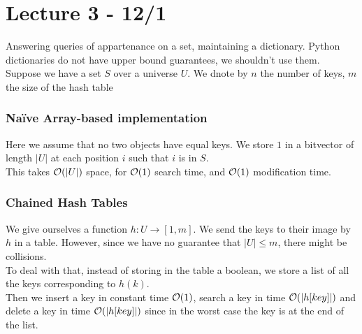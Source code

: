 \documentclass{cours}
\begin{document}
\part[Hashing]{Lecture 3 - 12/1}
\localtableofcontents

Answering queries of appartenance on a set, maintaining a dictionary. Python dictionaries do not have upper bound guarantees, we shouldn't use them. \\
Suppose we have a set $S$ over a universe $U$. We dnote by $n$ the number of keys, $m$ the size of the hash table

\section{Naïve Array-based implementation}
Here we assume that no two objects have equal keys. We store $1$ in a bitvector of length $|U|$ at each position $i$ such that $i$ is in $S$.\\
This takes $\mathcal{O}(|U|)$ space, for $\mathcal{O}(1)$ search time, and $\mathcal{O}(1)$ modification time. 

\section{Chained Hash Tables}
We give ourselves a function $h : U \rightarrow \left[1, m\right]$. We send the keys to their image by $h$ in a table. However, since we have no guarantee that $\left|U\right| \leq m$, there might be collisions.\\
To deal with that, instead of storing in the table a boolean, we store a list of all the keys corresponding to $h(k)$. \\
Then we insert a key in constant time $\mathcal{O}(1)$, search a key in time $\mathcal{O}(\left|h[key]\right|)$ and delete a key in time $\mathcal{O}(\left|h[key]\right|)$ since in the worst case the key is at the end of the list.\\
\end{document}
